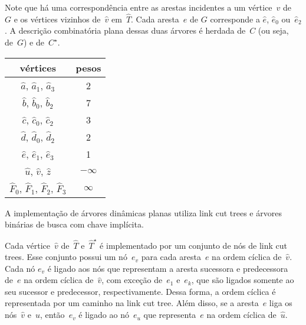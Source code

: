 Note que há uma correspondência entre as arestas incidentes a um vértice~$v$ de~$G$ e os vértices vizinhos de~$\hat v$ em~$\hat T$.
Cada aresta~$e$ de $G$ corresponde a $\hat e$, $\hat e_0$ ou~$\hat e_2$. 
A descrição combinatória plana dessas duas árvores é herdada de~$C$ (ou seja, de~$G$) e de~$C^\star$.



\begin{minipage}[b]{0.4\textwidth}
\centering
\begin{tabular}{| c  c |} 
 \hline
 vértices & pesos\\
 \hline
 $\hat a$, $\hat a_1$, $\hat a_3$ & 2 \\ 
 \hline
 $\hat b$, $\hat b_0$, $\hat b_2$ & 7 \\
 \hline
 $\hat c$, $\hat c_0$, $\hat c_2$ & 3 \\
 \hline
 $\hat d$, $\hat d_0$, $\hat d_2$ & 2 \\
 \hline
 $\hat e$, $\hat e_1$, $\hat e_3$ & 1 \\
 \hline
 $\hat u$, $\hat v$, $\hat z$ & $-\infty$ \\
 \hline
 $\hat F_0$, $\hat F_1$, $\hat F_2$, $\hat F_3$ & $\infty$ \\
 \hline
\end{tabular}
\end{minipage}
\hfill
\begin{minipage}[b]{0.5\textwidth}
    \centering

\label{fig:MSF-figura-3}
    \end{minipage}

A implementação de árvores dinâmicas planas utiliza link cut trees e árvores binárias de busca com chave implícita.

Cada vértice~$\hat v$ de~$\hat T$ e~$\hat T^\star$ é implementado por um conjunto de nós de link cut trees.
Esse conjunto possui um nó~$e_v$ para cada aresta~$e$ na ordem cíclica de~$\hat v$.
Cada nó $e_v$ é ligado aos nós que representam a aresta sucessora e predecessora de~$e$ na ordem cíclica de~$\hat v$,
com exceção de~$e_1$ e~$e_k$, que são ligados somente ao seu sucessor e predecessor, respectivamente.
Dessa forma, a ordem cíclica é representada por um caminho na link cut tree.
Além disso, se a aresta~$e$ liga os nós~$\hat v$ e~$\hat u$, então~$e_v$ é ligado ao nó~$e_u$ que representa~$e$ na ordem cíclica de~$\hat u$.

